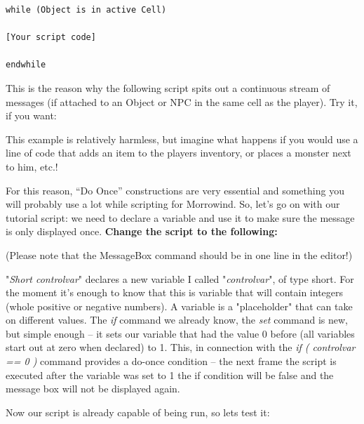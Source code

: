 \begin{lstlisting}
while (Object is in active Cell)

[Your script code]

endwhile
\end{lstlisting}

This is the reason why the following script spits out a continuous stream of messages (if attached to an Object or NPC in the same cell as the player). Try it, if you want:



This example is relatively harmless, but imagine what happens if you would use a line of code that adds an item to the players inventory, or places a monster next to him, etc.!

For this reason, ``Do Once'' constructions are very essential and something you will probably use a lot while scripting for Morrowind. So, let's go on with our tutorial script: we need to declare a variable and use it to make sure the message is only displayed once. \textbf{Change the script to the following:}



(Please note that the MessageBox command should be in one line in the editor!)

"\emph{Short controlvar}" declares a new variable I called "\emph{controlvar}", of type short. For the moment it's enough to know that this is variable that will contain integers (whole positive or negative numbers). A variable is a "placeholder" that can take on different values. The \emph{if} command we already know, the \emph{set} command is new, but simple enough -- it sets our variable that had the value 0 before (all variables start out at zero when declared) to 1. This, in connection with the \emph{if ( controlvar == 0 )} command provides a do-once condition -- the next frame the script is executed after the variable was set to 1 the if condition will be false and the message box will not be displayed again.

Now our script is already capable of being run, so lets test it:


